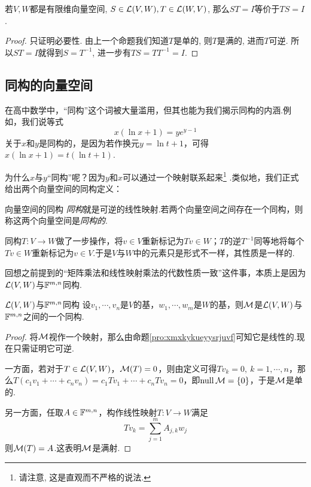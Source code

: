 \begin{proposition}{}
	若$V,W$都是有限维向量空间, $S \in \mathcal{L} (V,W), T \in \mathcal{L} (W,V)$, 那么$ST=I$等价于$TS=I$. 
\end{proposition}
\begin{proof}
	只证明必要性. 由上一个命题我们知道$T$是单的, 则$T$是满的, 进而$T$可逆. 所以$ST=I$就得到$S=T^{-1}$, 进一步有$TS = TT^{-1} = I$. 
\end{proof}

\subsection{同构的向量空间}

在高中数学中，“同构”这个词被大量滥用，但其也能为我们揭示同构的内涵.例如，我们说等式$$x(\ln x+1) = ye^{y-1}$$关于$x$和$y$是同构的，是因为若作换元$y=\ln t+1$，可得$x(\ln x +1) = t(\ln t +1)$.

为什么$x$与$y$“同构”呢？因为$y$和$x$可以通过一个映射联系起来\footnote{请注意, 这是直观而不严格的说法. } .类似地，我们正式给出两个向量空间的同构定义：

\begin{definition}{向量空间的同构}
	\textit{同构}就是可逆的线性映射.若两个向量空间之间存在一个同构，则称这两个向量空间是\textit{同构的}.
\end{definition}

同构$T:V \to W$做了一步操作，将$v \in V$重新标记为$Tv \in W$；$T$的逆$T^{-1}$同等地将每个$Tv \in W$重新标记为$v \in V$.于是$V$与$W$中的元素只是形式不一样，其性质是一样的.

回想之前提到的“矩阵乘法和线性映射乘法的代数性质一致”这件事，本质上是因为$\mathcal{L} (V,W)$与$\mathbb{F} ^{m,n}$同构.

\begin{proposition}{$\mathcal{L} (V,W)$与$\mathbb{F} ^{m,n}$同构}
	设$v_1, \cdots ,v_n$是$V$的基，$w_1, \cdots ,w_m$是$W$的基，则$\mathcal{M}$是$\mathcal{L} (V,W)$与$\mathbb{F} ^{m,n}$之间的一个同构.
\end{proposition}
\begin{proof}
	将$\mathcal{M}$视作一个映射，那么由命题\ref{pro:xmxkykueyysrjuvf}可知它是线性的.现在只需证明它可逆. 
	
	一方面，若对于$T \in \mathcal{L} (V,W)$，$\mathcal{M} (T)=0$，则由定义可得$Tv_k=0,~k=1,\cdots ,n$，那么$T(c_1v_1 + \cdots + c_nv_n)=c_1Tv_1 + \cdots + c_nTv_n =0$，即$\operatorname{null} \mathcal{M} = \{ 0 \}$，于是$\mathcal{M}$是单的. 
	
	另一方面，任取$A \in \mathbb{F} ^{m,n}$，构作线性映射$T:V \to W$满足$$Tv_k = \sum_{j=1}^{m} A_{j,k} w_j$$
	则$\mathcal{M} (T) =A$.这表明$\mathcal{M}$是满射.
\end{proof}

